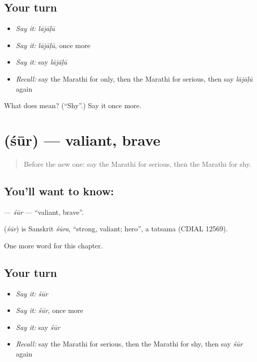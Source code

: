 \subsection*{Your turn}
\begin{itemize}
\raggedright
  \item \emph{Say it:} \emph{lājāḷū}
  \item \emph{Say it:} \emph{lājāḷū}, once more
  \item \emph{Say it:} say \emph{lājāḷū}
  \item \emph{Recall:} say the Marathi for only, then the Marathi for serious, then say \emph{lājāḷū} again
\end{itemize}

\begin{tcolorbox}[breakable,colback=teal!4,colframe=teal!35!black,title={Before you move on}]
What does  mean? (\textquotedblleft{}Shy\textquotedblright{}.) Say it once more.
\end{tcolorbox}
\section[\texorpdfstring{\mr{शूर} (śūr)}{शूर (śūr)}]{ (śūr) — valiant, brave}

\label{lesson:MR-C204-sur}



\begin{quote}
Before the new one: say the Marathi for serious, then the Marathi for shy.
\end{quote}

\subsection*{You'll want to know: }
\textbf{} — \emph{śūr} — \textquotedblleft{}valiant, brave\textquotedblright{}.

\begin{cousinweb}
\textbf{} (\emph{śūr}) is Sanskrit \emph{śūra}, \textquotedblleft{}strong, valiant; hero\textquotedblright{}, a tatsama (CDIAL 12569).
\end{cousinweb}

\begin{grammarlens}[title={What you've built}]
One more word for this chapter.
\end{grammarlens}

\subsection*{Your turn}
\begin{itemize}
\raggedright
  \item \emph{Say it:} \emph{śūr}
  \item \emph{Say it:} \emph{śūr}, once more
  \item \emph{Say it:} say \emph{śūr}
  \item \emph{Recall:} say the Marathi for serious, then the Marathi for shy, then say \emph{śūr} again
\end{itemize}

